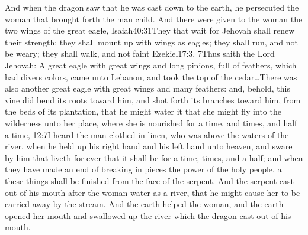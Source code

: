 And when the dragon saw that he was cast down to the earth, he persecuted the woman that brought forth the man child. 
And there were given to the woman the two wings of the great eagle,%
				   {Isaiah}{40:31}{They that wait for Jehovah shall renew their strength; they shall mount up with wings as eagles; they shall run, and not be weary; they shall walk, and not faint}%
				   {Ezekiel}{17:3, 7}{Thus saith the Lord Jehovah: A great eagle with great wings and long pinions, full of feathers, which had divers colors, came unto Lebanon, and took the top of the cedar\ldots There was also another great eagle with great wings and many feathers: and, behold, this vine did bend its roots toward him, and shot forth its branches toward him, from the beds of its plantation, that he might water it}
 that she might fly into the wilderness unto her place, where she is nourished for a time, and times, and half a time,%
				    {12:7}{I heard the man clothed in linen, who was above the waters of the river, when he held up his right hand and his left hand unto heaven, and sware by him that liveth for ever that it shall be for a time, times, and a half; and when they have made an end of breaking in pieces the power of the holy people, all these things shall be finished}
 from the face of the serpent. 
And the serpent cast out of his mouth after the woman water as a river, that he might cause her to be carried away by the stream. 
And the earth helped the woman, and the earth opened her mouth and swallowed up the river which the dragon cast out of his mouth.%
